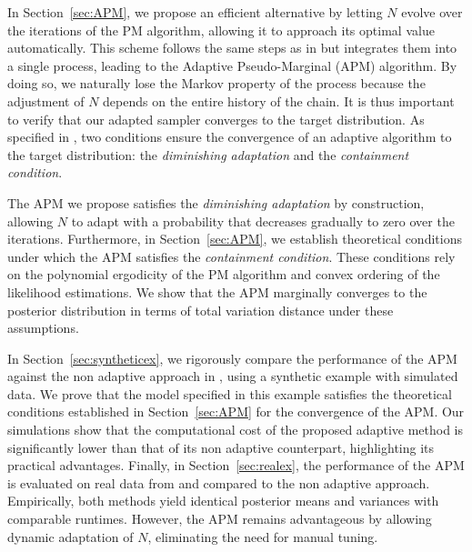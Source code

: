 \documentclass[pdflatex,sn-mathphys-num]{sn-jnl}
\theoremstyle{thmstyleone}
\theoremstyle{thmstyletwo}
\theoremstyle{thmstylethree}
\begin{document}
In Section~\ref{sec:APM}, we propose an efficient alternative by letting $N$ evolve over the iterations of the PM algorithm, allowing it to approach its optimal value automatically. This scheme follows the same steps as in \cite{schmon_large-sample_2021} but integrates them into a single process, leading to the Adaptive Pseudo-Marginal (APM) algorithm. By doing so, we naturally lose the Markov property of the process because the adjustment of $N$ depends on the entire history of the chain. It is thus important to verify that our adapted sampler converges to the target distribution. As specified in \cite{roberts_coupling_2007}, two conditions ensure the convergence of an adaptive algorithm to the target distribution: the \textit{diminishing adaptation} and the \textit{containment condition}.

The APM we propose satisfies the \textit{diminishing adaptation} by construction, allowing $N$ to adapt with a probability that decreases gradually to zero over the iterations. Furthermore, in Section~\ref{sec:APM}, we establish theoretical conditions under which the APM satisfies the \textit{containment condition}. These conditions rely on the polynomial ergodicity of the PM algorithm and convex ordering of the likelihood estimations. We show that the APM marginally converges to the posterior distribution in terms of total variation distance under these assumptions.

In Section~\ref{sec:syntheticex}, we rigorously compare the performance of the APM against the non adaptive approach in \cite{schmon_large-sample_2021}, using a synthetic example with simulated data. We prove that the model specified in this example satisfies the theoretical conditions established in Section~\ref{sec:APM} for the convergence of the APM. Our simulations show that the computational cost of the proposed adaptive method is significantly lower than that of its non adaptive counterpart, highlighting its practical advantages. Finally, in Section~\ref{sec:realex}, the performance of the APM is evaluated on real data from \cite{zeger_generalized_1991} and compared to the non adaptive approach. Empirically, both methods yield identical posterior means and variances with comparable runtimes. However, the APM remains advantageous by allowing dynamic adaptation of \( N \), eliminating the need for manual tuning.
\end{document}
